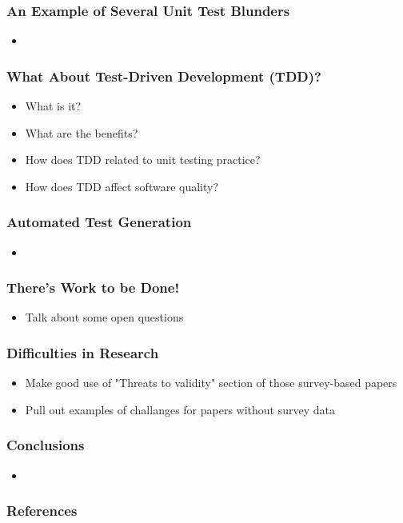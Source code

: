 \documentclass{beamer}
\begin{document}
\begin{frame}
\frametitle{An Example of Several Unit Test Blunders}
\begin{itemize}
	\item 
\end{itemize}
\end{frame}

\begin{frame}
\frametitle{What About Test-Driven Development (TDD)?}
\begin{itemize}
	\item What is it?
	\item What are the benefits?
	\item How does TDD related to unit testing practice?
	\item How does TDD affect software quality?
\end{itemize}
\end{frame}

\begin{frame}
\frametitle{Automated Test Generation}
\begin{itemize}
	\item 
\end{itemize}
\end{frame}

\begin{frame}
\frametitle{There's Work to be Done!}
\begin{itemize}
	\item Talk about some open questions
\end{itemize}
\end{frame}

\begin{frame}
\frametitle{Difficulties in Research}
\begin{itemize}
	\item Make good use of "Threats to validity" section of those survey-based papers
	\item Pull out examples of challanges for papers without survey data
\end{itemize}
\end{frame}

\begin{frame}
\frametitle{Conclusions}
\begin{itemize}
	\item 
\end{itemize}
\end{frame}

\begin{frame}
\frametitle{References}
	
	
\end{frame}
\end{document}
